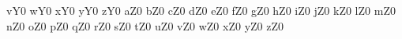 {	{vY}{}{0}
	{wY}{}{0}
	{xY}{}{0}
	{yY}{}{0}
	{zY}{}{0}
	{aZ}{}{0}
	{bZ}{}{0}
	{cZ}{}{0}
	{dZ}{}{0}
	{eZ}{}{0}
	{fZ}{}{0}
	{gZ}{}{0}
	{hZ}{}{0}
	{iZ}{}{0}
	{jZ}{}{0}
	{kZ}{}{0}
	{lZ}{}{0}
	{mZ}{}{0}
	{nZ}{}{0}
	{oZ}{}{0}
	{pZ}{}{0}
	{qZ}{}{0}
	{rZ}{}{0}
	{sZ}{}{0}
	{tZ}{}{0}
	{uZ}{}{0}
	{vZ}{}{0}
	{wZ}{}{0}
	{xZ}{}{0}
	{yZ}{}{0}
	{zZ}{}{0}
}

\newcommand{\code}[1]{\lstinline[style=inline]!#1!}
\newcommand{\class}[1]{\code{#1}}
\newcommand{\const}[1]{\code{#1}}
\newcommand{\var}[1]{\code{#1}}